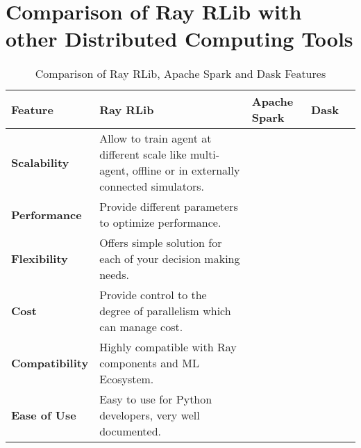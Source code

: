 \section{Comparison of Ray RLib with other Distributed Computing Tools}



\begin{table}[ht]
\centering
\begin{tabular}{|p{2.5cm}|p{2.8cm}|p{2.8cm}|p{2.8cm}|p{2.8cm}|}
\hline
\textbf{Feature} & \textbf{Ray RLib}  & \textbf{Apache Spark} & \textbf{Dask} \\
\hline
\textbf{Scalability} & Allow to train agent at different scale like multi-agent, offline or in externally connected simulators. \cite{ray_documentation} & & \\
\hline
\textbf{Performance} & Provide different parameters to optimize performance. \cite{ray_documentation} & & \\
\hline
\textbf{Flexibility} & Offers simple solution for each of your decision making needs. \cite{ray_documentation} & & \\
\hline
\textbf{Cost} & Provide control to the degree of parallelism which can manage cost. \cite{ray_documentation}& & \\
\hline
\textbf{Compatibility} & Highly compatible with Ray components and ML Ecosystem. \cite{ray_documentation} & & \\
\hline
\textbf{Ease of Use} & Easy to use for Python developers, very well documented. & & \\
\hline

\hline
\end{tabular}
\caption{Comparison of Ray RLib, Apache Spark and Dask Features}
\label{tab:table6}
\end{table}